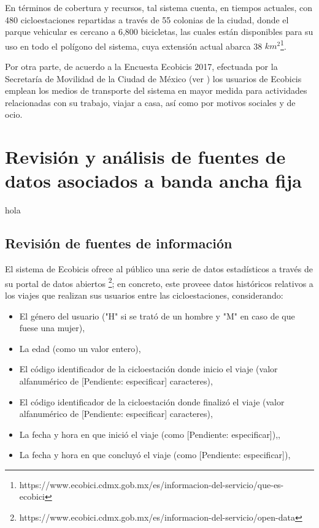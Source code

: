 \documentclass[9pt,twocolumn,twoside]{ilcss}
\begin{document}
En términos de cobertura y recursos, tal sistema cuenta, en tiempos actuales, con 480 cicloestaciones repartidas a través de 55 colonias de la ciudad, donde el parque vehicular es cercano a 6,800 bicicletas, las cuales están disponibles para su uso en todo el polígono del sistema, cuya extensión actual abarca 38 $km^2$\footnote{https://www.ecobici.cdmx.gob.mx/es/informacion-del-servicio/que-es-ecobici}.

Por otra parte, de acuerdo a la Encuesta Ecobicis 2017, efectuada por la Secretaría de Movilidad de la Ciudad de México (ver \cite{Ecobicis2017}) los usuarios de Ecobicis emplean los medios de transporte del sistema en mayor medida para actividades relacionadas con su trabajo, viajar a casa, así como por motivos sociales y de ocio.

\section{Revisión y análisis de fuentes de datos asociados a banda ancha fija}

hola

\subsection{Revisión de fuentes de información}

El sistema de Ecobicis ofrece al público una serie de datos estadísticos a través de su portal de datos abiertos \footnote{https://www.ecobici.cdmx.gob.mx/es/informacion-del-servicio/open-data}; en concreto, este proveee datos históricos relativos a los viajes que realizan sus usuarios entre las cicloestaciones, considerando:
\begin{itemize}
	\item El género del usuario ("H" si se trató de un hombre y "M" en caso de que fuese una mujer), \vspace{-0.2cm}
	\item La edad (como un valor entero),\vspace{-0.2cm}
	\item El código identificador de la cicloestación donde inicio el viaje (valor alfanumérico de [Pendiente: especificar] caracteres),\vspace{-0.2cm}
	\item El código identificador de la cicloestación donde finalizó el viaje (valor alfanumérico de [Pendiente: especificar] caracteres),\vspace{-0.2cm}
	\item La fecha y hora en que inició el viaje (como [Pendiente: especificar]),\vspace{-0.2cm},
	\item La fecha y hora en que concluyó el viaje (como [Pendiente: especificar]),\vspace{-0.2cm}

\end{itemize}
\end{document}
